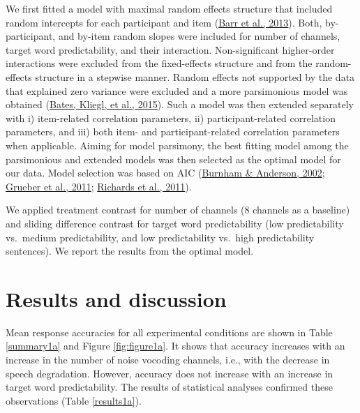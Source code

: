 \documentclass[a4paper, nobind]{templates/ociamthesis}
\begin{document}
We first fitted a model with maximal random effects structure that included random intercepts for each participant and item (\protect\hyperlink{ref-Barr2013}{Barr et al., 2013}).
Both, by-participant, and by-item random slopes were included for number of channels, target word predictability, and their interaction.
Non-significant higher-order interactions were excluded from the fixed-effects structure and from the random-effects structure in a stepwise manner.
Random effects not supported by the data that explained zero variance were excluded and a more parsimonious model was obtained (\protect\hyperlink{ref-Bates2015a}{Bates, Kliegl, et al., 2015}).
Such a model was then extended separately with i) item-related correlation parameters, ii) participant-related correlation parameters, and iii) both item- and participant-related correlation parameters when applicable.
Aiming for model parsimony, the best fitting model among the parsimonious and extended models was then selected as the optimal model for our data. Model selection was based on AIC (\protect\hyperlink{ref-Burnham2002}{Burnham \& Anderson, 2002}; \protect\hyperlink{ref-Grueber2011}{Grueber et al., 2011}; \protect\hyperlink{ref-Richards2011}{Richards et al., 2011}).

We applied treatment contrast for number of channels (8 channels as a baseline) and sliding difference contrast for target word predictability (low predictability vs.~medium predictability, and low predictability vs.~high predictability sentences).
We report the results from the optimal model.

\hypertarget{results-and-discussion}{%
\section{Results and discussion}\label{results-and-discussion}}

Mean response accuracies for all experimental conditions are shown in Table \ref{summary1a} and Figure \ref{fig:figure1a}.
It shows that accuracy increases with an increase in the number of noise vocoding channels, i.e., with the decrease in speech degradation.
However, accuracy does not increase with an increase in target word predictability.
The results of statistical analyses confirmed these observations (Table \ref{results1a}).
\end{document}

